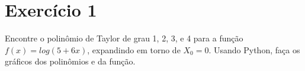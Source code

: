 \section{Exercício 1}

Encontre o polinômio de Taylor de grau 1, 2, 3, e 4 para a função $ f(x) = log(5+6x) $,
expandindo em torno de $X_0 = 0$. Usando Python, faça os gráficos dos polinômios e da
função.

